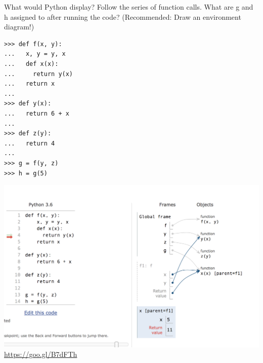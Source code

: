 \begin{blocksection}
\question What would Python display? Follow the series of function calls. What are g and h assigned to after running the code? (Recommended: Draw an environment diagram!)

\begin{lstlisting}
>>> def f(x, y):
...   x, y = y, x
...   def x(x):
...     return y(x)
...   return x
...
>>> def y(x):
...   return 6 + x
...
>>> def z(y):
...   return 4
... 
>>> g = f(y, z)
>>> h = g(5)
\end{lstlisting}

\begin{solution}
\includegraphics[scale=0.5]{fxyz.png}
\newline
\url{https://goo.gl/B7dFTh}
\end{solution}
\end{blocksection}
